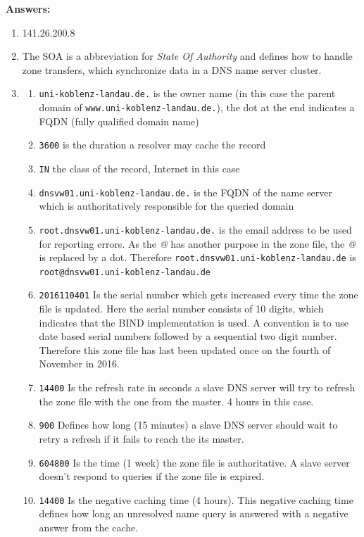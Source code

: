 \documentclass{WeSTassignment}
\begin{document}
\textbf{Answers:}\\

\begin{enumerate}
\item 141.26.200.8
\item The SOA is a abbreviation for \textit{State Of Authority} and defines how to handle zone transfers, which synchronize data in a DNS name server cluster.
\item 
	\begin{enumerate}
	\item \texttt{uni-koblenz-landau.de.} is the owner name (in this case the parent domain of \texttt{www.uni-koblenz-landau.de.}), the dot at the end indicates a FQDN (fully qualified domain name)
    \item \texttt{3600} is the duration a resolver may cache the record
    \item \texttt{IN} the class of the record, Internet in this case
    \item \texttt{dnsvw01.uni-koblenz-landau.de.} is the FQDN of the name server which is authoritatively responsible for the queried domain
    \item \texttt{root.dnsvw01.uni-koblenz-landau.de.} is the email address to be used for reporting errors. As the \textit{@} has another purpose in the zone file, the \textit{@} is replaced by a dot. Therefore \texttt{root.dnsvw01.uni-koblenz-landau.de} is \texttt{root@dnsvw01.uni-koblenz-landau.de}
    \item \texttt{2016110401} Is the serial number which gets increased every time the zone file is updated. Here the serial number consists of 10 digits, which indicates that the BIND implementation is used. A convention is to use date based serial numbers followed by a sequential two digit number. Therefore this zone file has last been updated once on the fourth of November in 2016.
    \item \texttt{14400} Is the refresh rate in seconds a slave DNS server will try to refresh the zone file with the one from the master. 4 hours in this case.
    \item \texttt{900} Defines how long (15 minutes) a slave DNS server should wait to retry a refresh if it fails to reach the its master.
    \item \texttt{604800} Is the time (1 week) the zone file is authoritative. A slave server doesn't respond to queries if the zone file is expired.
    \item \texttt{14400} Is the negative caching time (4 hours). This negative caching time defines how long an unresolved name query is answered with a negative answer from the cache.
	\end{enumerate}
\end{enumerate}
\end{document}
